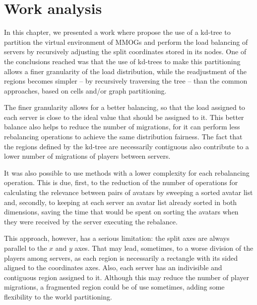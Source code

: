 \section{Work analysis}

In this chapter, we presented a work where \cite{bezerra2009fgl} propose the use of a kd-tree to partition the virtual environment of MMOGs and perform the load balancing of servers by recursively adjusting the split coordinates stored in its nodes. One of the conclusions reached was that the use of kd-trees to make this partitioning allows a finer granularity of the load distribution, while the readjustment of the regions becomes simpler -- by recursively traversing the tree -- than the common approaches, based on cells and/or graph partitioning.

The finer granularity allows for a better balancing, so that the load assigned to each server is close to the ideal value that should be assigned to it. This better balance also helps to reduce the number of migrations, for it can perform less rebalancing operations to achieve the same distribution fairness. The fact that the regions defined by the kd-tree are necessarily contiguous also contribute to a lower number of migrations of players between servers.

It was also possible to use methods with a lower complexity for each rebalancing operation. This is due, first, to the reduction of the number of operations for calculating the relevance between pairs of avatars by sweeping a sorted avatar list and, secondly, to keeping at each server an avatar list already sorted in both dimensions, saving the time that would be spent on sorting the avatars when they were received by the server executing the rebalance.

This approach, however, has a serious limitation: the split axes are always parallel to the $x$ and $y$ axes. That may lead, sometimes, to a worse division of the players among servers, as each region is necessarily a rectangle with its sided aligned to the coordinates axes. Also, each server has an indivisible and contiguous region assigned to it. Although this may reduce the number of player migrations, a fragmented region could be of use sometimes, adding some flexibility to the world partitioning.